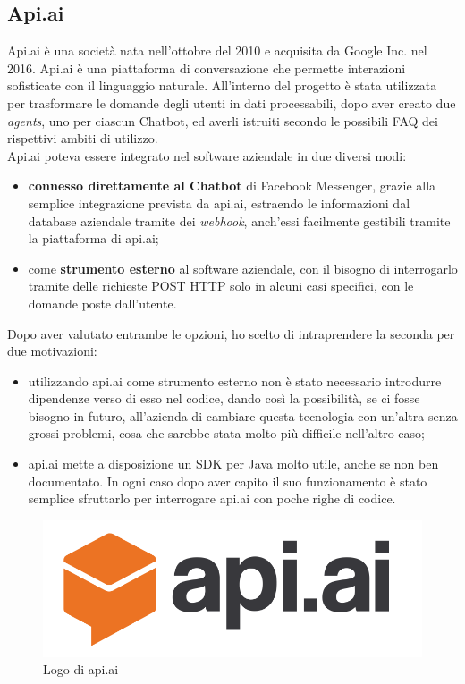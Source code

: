 \subsection{Api.ai}
Api.ai è una società nata nell'ottobre del 2010 e acquisita da Google Inc. nel 2016. Api.ai è una piattaforma di conversazione
che permette interazioni sofisticate con il linguaggio naturale. All'interno del progetto è stata utilizzata per trasformare le domande degli utenti in dati processabili, dopo aver creato due \emph{agents}, uno per ciascun \gls{Chatbot}, ed averli istruiti secondo le possibili \gls{FAQ} dei rispettivi ambiti di utilizzo.\\
Api.ai poteva essere integrato nel software aziendale in due diversi modi:
\begin{itemize}
	\item \textbf{connesso direttamente al \gls{Chatbot}} di Facebook Messenger, grazie alla semplice integrazione prevista da api.ai, estraendo le informazioni dal database aziendale tramite dei \emph{webhook}, anch'essi facilmente gestibili tramite la piattaforma di api.ai;
	\item come \textbf{strumento esterno} al software aziendale, con il bisogno di interrogarlo tramite delle richieste \gls{POST} HTTP solo in alcuni casi specifici, con le domande poste dall'utente.
\end{itemize} 
Dopo aver valutato entrambe le opzioni, ho scelto di intraprendere la seconda per due motivazioni:
\begin{itemize}
	\item utilizzando api.ai come strumento esterno non è stato necessario introdurre dipendenze verso di esso nel codice, dando così la possibilità, se ci fosse bisogno in futuro, all'azienda di cambiare questa tecnologia con un'altra senza grossi problemi, cosa che sarebbe stata molto più difficile nell'altro caso;
	\item api.ai mette a disposizione un \gls{SDK} per Java molto utile, anche se non ben documentato. In ogni caso dopo aver capito il suo funzionamento è stato semplice sfruttarlo per interrogare api.ai con poche righe di codice. 
\end{itemize}
\begin{figure}[h]
	\centering
	\includegraphics[scale=0.2]{../Immagini/apiai.png}
	\caption{Logo di api.ai}
\end{figure}
